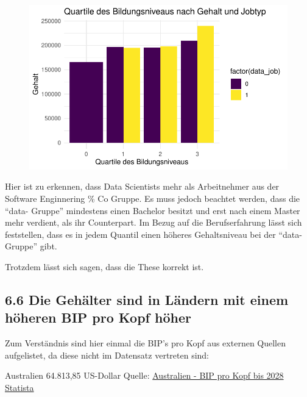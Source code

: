 \documentclass[
  letterpaper,
  DIV=11,
  numbers=noendperiod]{scrartcl}
\begin{document}
\begin{figure}[H]

{\centering \includegraphics{main_doc_files/figure-pdf/unnamed-chunk-92-1.pdf}

}

\end{figure}

Hier ist zu erkennen, dass Data Scientists mehr als Arbeitnehmer aus der
Software Enginnering \% Co Gruppe. Es muss jedoch beachtet werden, dass
die ``data- Gruppe'' mindestens einen Bachelor besitzt und erst nach
einem Master mehr verdient, als ihr Counterpart. Im Bezug auf die
Berufserfahrung lässt sich feststellen, dass es in jedem Quantil einen
höheres Gehaltsniveau bei der ``data-Gruppe'' gibt.

Trotzdem lässt sich sagen, dass die These korrekt ist.

\hypertarget{die-gehuxe4lter-sind-in-luxe4ndern-mit-einem-huxf6heren-bip-pro-kopf-huxf6her}{%
\subsection{6.6 Die Gehälter sind in Ländern mit einem höheren BIP pro
Kopf
höher}\label{die-gehuxe4lter-sind-in-luxe4ndern-mit-einem-huxf6heren-bip-pro-kopf-huxf6her}}

Zum Verständnis sind hier einmal die BIP's pro Kopf aus externen Quellen
aufgelistet, da diese nicht im Datensatz vertreten sind:

Australien 64.813,85 US-Dollar Quelle:
\href{https://de.statista.com/statistik/daten/studie/14425/umfrage/bruttoinlandsprodukt-pro-kopf-in-australien/\#:~:text=Im\%20Jahr\%202022\%20hat\%20das\%20Bruttoinlandsprodukt\%20pro\%20Kopf,Kopf\%20in\%20Australien\%20auf\%20rund\%2063.487\%2C05\%20US-Dollar\%20prognostiziert.}{Australien
- BIP pro Kopf bis 2028 \textbar{} Statista}
\end{document}

